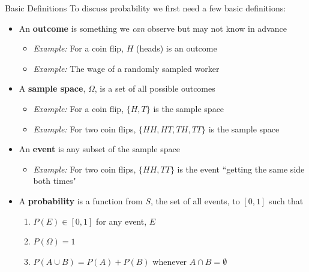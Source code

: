 \begin{frame}{Basic Definitions}
To discuss probability we first need a few basic definitions:
\begin{itemize}
	\item An {\bf outcome} is something we \emph{can} observe but may not know in advance
	\begin{itemize}
		\item[] \emph{Example:} For a coin flip, $H$ (heads) is an outcome
		\item[] \emph{Example:} The wage of a randomly sampled worker
	\end{itemize}	
	\item A {\bf sample space}, $\Omega$, is a set of all possible outcomes
		\begin{itemize}
		\item[] \emph{Example:} For a coin flip, $\{H,T\}$ is the sample space
		\item[] \emph{Example:} For two coin flips, $\{HH,HT,TH,TT\}$ is the sample space
	\end{itemize}
	\item An {\bf event} is any subset of the sample space
		\begin{itemize}
			\item[] \emph{Example:} For two coin flips, $\{HH,TT\}$ is the event ``getting the same side both times"
		\end{itemize}
		
	\item A {\bf probability} is a function from $S$, the set of all events, to $[0,1]$ such that
	{\small \begin{enumerate}
			\item $P(E)\in[0,1]$ for any event, $E$
			\item $P(\Omega)=1$
			\item $P(A\cup B) = P(A)+P(B)$ whenever $A\cap B = \emptyset$
		\end{enumerate}}

\end{itemize}
\end{frame}




